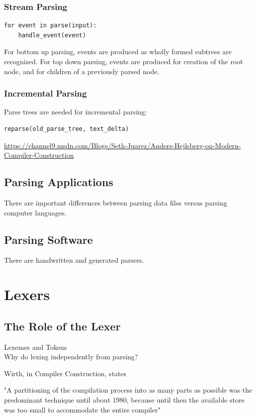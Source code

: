 \documentclass{book}
\begin{document}
\subsection{Stream Parsing}
\begin{verbatim}
for event in parse(input):
    handle_event(event)
\end{verbatim}

For bottom up parsing, events are produced as wholly formed subtrees are recognized.
For top down parsing, events are produced for creation of the root node, and 
for children of a previously parsed node.

\subsection{Incremental Parsing}
Parse trees are needed for incremental parsing:
\begin{verbatim}
reparse(old_parse_tree, text_delta)
\end{verbatim}
\url{https://channel9.msdn.com/Blogs/Seth-Juarez/Anders-Hejlsberg-on-Modern-Compiler-Construction}


\section{Parsing Applications}
There are important differences between parsing 
data files versus parsing computer languages.

\section{Parsing Software}
There are handwritten and generated parsers.

\chapter{Lexers}

\section{The Role of the Lexer}

Lexemes and Tokens\\

Why do lexing independently from parsing?

Wirth, in Compiler Construction, states

"A partitioning of the compilation process into as many parts as possible was the predominant
technique until about 1980, because until then the available store was too small to
accommodate the entire compiler"
\end{document}
